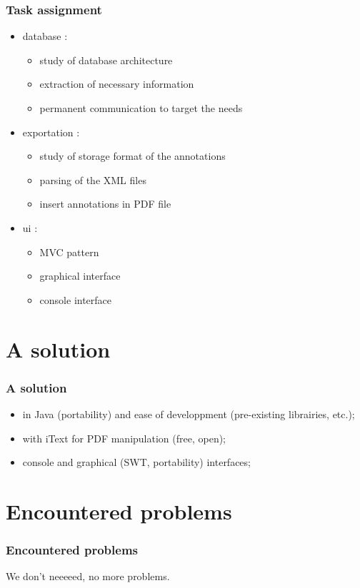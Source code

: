 \documentclass[t,12pt]{beamer}
\begin{document}
\begin{frame}
  \frametitle{Task assignment}
  \begin{itemize}
    \pause \item database :
	\begin{itemize}
		\item study of database architecture
		\item extraction of necessary information
		\item permanent communication to target the needs
	\end{itemize}
	\pause \item exportation :
	\begin{itemize}
		\item study of storage format of the annotations
		\item parsing of the XML files
		\item insert annotations in PDF file
	\end{itemize}
	\pause \item ui :
	\begin{itemize}
		\item MVC pattern
		\item graphical interface
		\item console interface
	\end{itemize}
  \end{itemize}
\end{frame}

\section{A solution}
\begin{frame}
  \frametitle{A solution}
  \begin{itemize}
    \item in Java (portability) and ease of developpment (pre-existing
      librairies, etc.);
    \pause \item with iText for PDF manipulation (free, open);
    \pause \item console and graphical (SWT, portability) interfaces;
  \end{itemize}
\end{frame}

\section{Encountered problems}
\begin{frame}
  \frametitle{Encountered problems}
  We don't neeeeed, no more problems.
\end{frame}
\end{document}
